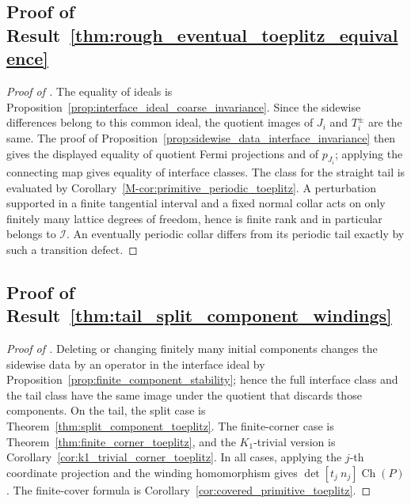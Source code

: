\documentclass[11pt]{article}
\numberwithin{equation}{section}
\theoremstyle{definition}
\theoremstyle{remark}
\newcommand{\Ch}{\operatorname{Ch}}
\begin{document}
\subsection{Proof of Result~\ref{thm:rough_eventual_toeplitz_equivalence}}\label{app:proof:thm:rough_eventual_toeplitz_equivalence}
\begin{proof}[Proof of ]
The equality of ideals is Proposition~\ref{prop:interface_ideal_coarse_invariance}. Since the
sidewise differences belong to this common ideal, the quotient images of \(J_i\) and \(T_i^\pm\)
are the same. The proof of Proposition~\ref{prop:sidewise_data_interface_invariance} then gives the
displayed equality of quotient Fermi projections and of \(p_{J_i}\); applying the connecting map
gives equality of interface classes. The class for the straight tail is evaluated by
Corollary~\ref{M-cor:primitive_periodic_toeplitz}. A perturbation supported in a finite tangential
interval and a fixed normal collar acts on only finitely many lattice degrees of freedom, hence is
finite rank and in particular belongs to \(\mathcal I\). An eventually periodic collar differs from
its periodic tail exactly by such a transition defect.
\end{proof}

\subsection{Proof of Result~\ref{thm:tail_split_component_windings}}\label{app:proof:thm:tail_split_component_windings}
\begin{proof}[Proof of ]
Deleting or changing finitely many initial components changes the sidewise data by an operator in
the interface ideal by Proposition~\ref{prop:finite_component_stability}; hence the full interface
class and the tail class have the same image under the quotient that discards those components. On
the tail, the split case is Theorem~\ref{thm:split_component_toeplitz}. The finite-corner case is
Theorem~\ref{thm:finite_corner_toeplitz}, and the \(K_1\)-trivial version is
Corollary~\ref{cor:k1_trivial_corner_toeplitz}. In all cases, applying the \(j\)-th coordinate
projection and the winding homomorphism gives
\(\det[t_j\ n_j]\Ch(P)\). The finite-cover formula is
Corollary~\ref{cor:covered_primitive_toeplitz}.
\end{proof}
\end{document}
